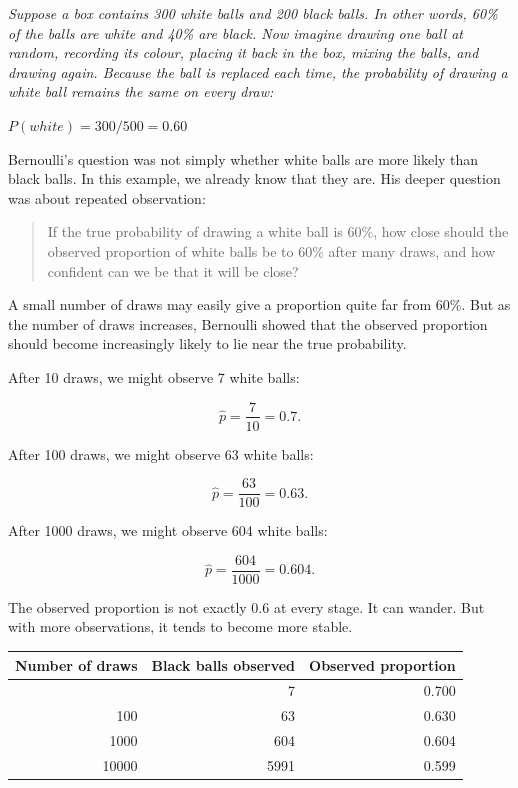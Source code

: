 \documentclass[
  letterpaper,
  DIV=11,
  numbers=noendperiod]{scrreprt}
\begin{document}
\emph{Suppose a box contains 300 white balls and 200 black balls. In
other words, 60\% of the balls are white and 40\% are black. Now imagine
drawing one ball at random, recording its colour, placing it back in the
box, mixing the balls, and drawing again. Because the ball is replaced
each time, the probability of drawing a white ball remains the same on
every draw:}

\(P(white)=300/500=0.60\)

Bernoulli's question was not simply whether white balls are more likely
than black balls. In this example, we already know that they are. His
deeper question was about repeated observation:

\begin{quote}
If the true probability of drawing a white ball is 60\%, how close
should the observed proportion of white balls be to 60\% after many
draws, and how confident can we be that it will be close?
\end{quote}

A small number of draws may easily give a proportion quite far from
60\%. But as the number of draws increases, Bernoulli showed that the
observed proportion should become increasingly likely to lie near the
true probability.

After 10 draws, we might observe 7 white balls:

\[
\hat{p} = \frac{7}{10} = 0.7.
\]

After 100 draws, we might observe 63 white balls:

\[
\hat{p} = \frac{63}{100} = 0.63.
\]

After 1000 draws, we might observe 604 white balls:

\[
\hat{p} = \frac{604}{1000} = 0.604.
\]

The observed proportion is not exactly 0.6 at every stage. It can
wander. But with more observations, it tends to become more stable.

\begin{table}
\fontsize{12.0pt}{14.0pt}\selectfont
\begin{tabular*}{\linewidth}{@{\extracolsep{\fill}}rrr}
\toprule
Number of draws & Black balls observed & Observed proportion \\ 
\midrule\addlinespace[2.5pt]
10 & 7 & 0.700 \\ 
100 & 63 & 0.630 \\ 
1000 & 604 & 0.604 \\ 
10000 & 5991 & 0.599 \\ 
\bottomrule
\end{tabular*}
\end{table}
\end{document}
